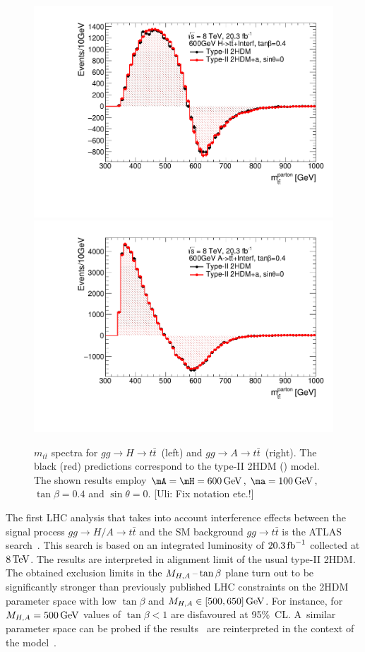 \begin{figure}
\centering
\includegraphics[width=.48\textwidth]{texinputs/04_grid/figures/ttres/ttres_2HDMvs2HDMa_H.pdf} \quad 
\includegraphics[width=.48\textwidth]{texinputs/04_grid/figures/ttres/ttres_2HDMvs2HDMa_A.pdf}
\caption{$m_{t \bar t}$ spectra for $gg \to H \to t \bar t$~(left) and  $gg \to A \to t \bar t$~(right). The black (red) predictions correspond to the type-II 2HDM (\hdma) model.  The shown results employ $\mA=\mH=600 \, {\rm GeV}$,  $\ma=100 \, {\rm GeV}$, $\tan \beta =0.4$ and $\sin \theta = 0$.  {\color{red} [Uli: Fix notation etc.!]}}
\label{fig:ttres_2HDMvs2HDMa}
\end{figure}

The first LHC analysis that takes into account interference effects between the signal process $gg \to H/A \to t \bar t$ and the SM background $gg \to t \bar t$ is the ATLAS search~\cite{Aaboud:2017hnm}. This search  is based on an integrated luminosity of $20.3 \, {\rm fb}^{-1}$ collected at $8 \, {\rm TeV}$. The results are interpreted in alignment limit of the usual type-II 2HDM. The obtained  exclusion limits in the $M_{H,A}\hspace{0.5mm}$--$\hspace{0.5mm} \tan \beta$ plane turn out to be significantly stronger than previously published LHC constraints on the 2HDM parameter space with low $\tan \beta$ and $M_{H,A} \in [500, 650] \, {\rm GeV}$. For instance,  for $M_{H,A} = 500 \, {\rm GeV}$ values of $\tan \beta < 1$ are disfavoured at 95\%~CL. A~similar parameter space  can be probed if the results~\cite{Aaboud:2017hnm} are reinterpreted in the context of the \hdma model~\cite{Bauer:2017ota}. 

